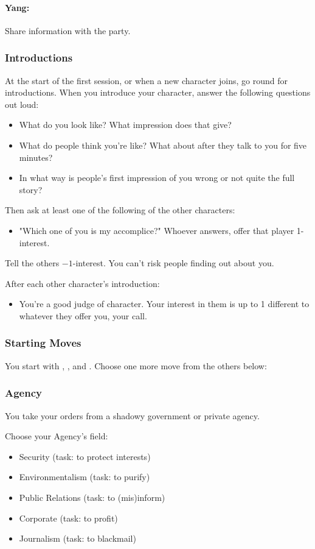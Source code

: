 \paragraph{Yang:} Share information with the party.

\subsubsection{Introductions}
At the start of the first session, or when a new character joins, go round for introductions.
When you introduce your character, answer the following questions out loud:
\begin{itemize}
\item What do you look like? What impression does that give?
\item What do people think you're like? What about after they talk to you for five minutes?
\item In what way is people's first impression of you wrong or not quite the full story?
\end{itemize}

Then ask at least one of the following of the other characters:
\begin{itemize}
\item "Which one of you is my accomplice?" Whoever answers, offer that player 1-interest.
\end{itemize}
Tell the others $-1$-interest. You can't risk people finding out about you.

After each other character's introduction:
\begin{itemize}
\item You're a good judge of character. Your interest in them is up to 1 different to whatever they offer you, your call.
\end{itemize}

\subsubsection{Starting Moves}
You start with , , and . Choose one more move from the others below:

\subsubsection{Agency}\label{sec:Agency}
You take your orders from a shadowy government or private agency.

Choose your Agency's field:
\begin{itemize}
\item Security (task: to protect interests)
\item Environmentalism (task: to purify)
\item Public Relations (task: to (mis)inform)
\item Corporate (task: to profit)
\item Journalism (task: to blackmail)
\end{itemize}


